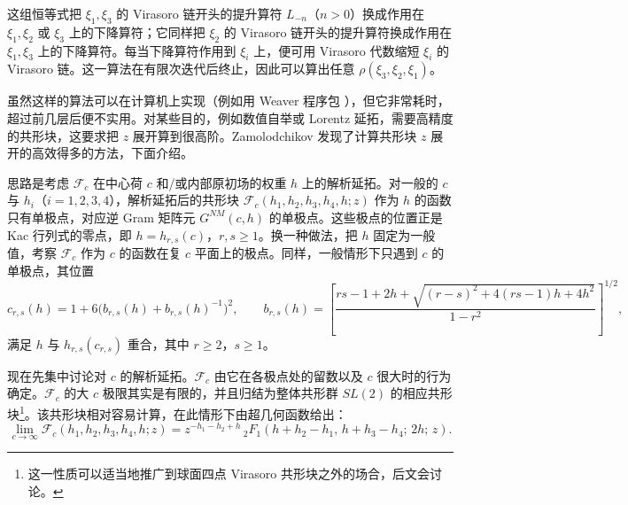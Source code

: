 这组恒等式把 $\xi_1,\xi_3$ 的 Virasoro 链开头的提升算符 $L_{-n}$（$n>0$）换成作用在 $\xi_1,\xi_2$ 或 $\xi_3$ 上的下降算符；它同样把 $\xi_2$ 的 Virasoro 链开头的提升算符换成作用在 $\xi_1,\xi_3$ 上的下降算符。每当下降算符作用到 $\xi_i$ 上，便可用 Virasoro 代数缩短 $\xi_i$ 的 Virasoro 链。这一算法在有限次迭代后终止，因此可以算出任意 $\rho(\xi_3,\xi_2,\xi_1)$。


虽然这样的算法可以在计算机上实现（例如用 Weaver 程序包 \cite{r8}），但它非常耗时，超过前几层后便不实用。对某些目的，例如数值自举或 Lorentz 延拓，需要高精度的共形块，这要求把 $z$ 展开算到很高阶。Zamolodchikov \cite{r9,r10} 发现了计算共形块 $z$ 展开的高效得多的方法，下面介绍。

思路是考虑 $\mathcal F_c$ 在中心荷 $c$ 和/或内部原初场的权重 $h$ 上的解析延拓。对一般的 $c$ 与 $h_i$（$i=1,2,3,4$），解析延拓后的共形块 $\mathcal F_c(h_1,h_2,h_3,h_4,h;z)$ 作为 $h$ 的函数只有单极点，对应逆 Gram 矩阵元 $G^{NM}(c,h)$ 的单极点。这些极点的位置正是 Kac 行列式的零点，即 $h=h_{r,s}(c)$，$r,s\ge1$。换一种做法，把 $h$ 固定为一般值，考察 $\mathcal F_c$ 作为 $c$ 的函数在复 $c$ 平面上的极点。同样，一般情形下只遇到 $c$ 的单极点，其位置
\begin{equation}\label{eq:3-14}
  c_{r,s}(h)=1+6\bigl(b_{r,s}(h)+b_{r,s}(h)^{-1}\bigr)^2,\qquad
  b_{r,s}(h)=\left[
  \frac{rs-1+2h+\sqrt{(r-s)^2+4(rs-1)h+4h^2}}{1-r^2}
  \right]^{1/2},
\end{equation}
满足 $h$ 与 $h_{r,s}(c_{r,s})$ 重合，其中 $r\ge2$，$s\ge1$。


现在先集中讨论对 $c$ 的解析延拓。$\mathcal F_c$ 由它在各极点处的留数以及 $c$ 很大时的行为确定。$\mathcal F_c$ 的大 $c$ 极限其实是有限的，并且归结为整体共形群 $SL(2)$ 的相应共形块\footnote{这一性质可以适当地推广到球面四点 Virasoro 共形块之外的场合，后文会讨论。}。该共形块相对容易计算，在此情形下由超几何函数给出：
\begin{equation}\label{eq:3-15}
  \lim_{c\to\infty}\mathcal F_c(h_1,h_2,h_3,h_4,h;z)
  =z^{-h_1-h_2+h}\,{}_2F_1(h+h_2-h_1,\,h+h_3-h_4;\,2h;\,z).
\end{equation}

